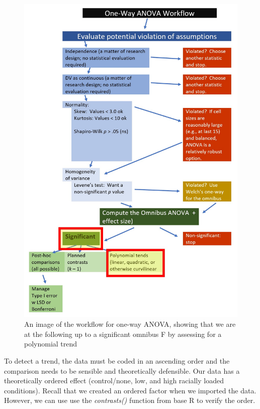 \documentclass[
  11pt,
]{book}
\newenvironment{Shaded}{\begin{snugshade}}{\end{snugshade}}
\newcommand{\FunctionTok}[1]{\textcolor[rgb]{0.27,0.27,0.27}{\textbf{#1}}}
\newcommand{\NormalTok}[1]{#1}
\newcommand{\SpecialCharTok}[1]{\textcolor[rgb]{0.43,0.43,0.43}{\textbf{#1}}}
\begin{document}
\begin{figure}
\centering
\includegraphics{images/oneway/OnewayWrkFlw_poly.jpg}
\caption{An image of the workflow for one-way ANOVA, showing that we are at the following up to a significant omnibus F by assessing for a polynomial trend}
\end{figure}

To detect a trend, the data must be coded in an ascending order and the comparison needs to be sensible and theoretically defensible. Our data has a theoretically ordered effect (control/none, low, and high racially loaded conditions). Recall that we created an ordered factor when we imported the data. However, we can use use the \emph{contrasts()} function from base R to verify the order.

\begin{Shaded}
\end{Shaded}
\end{document}
